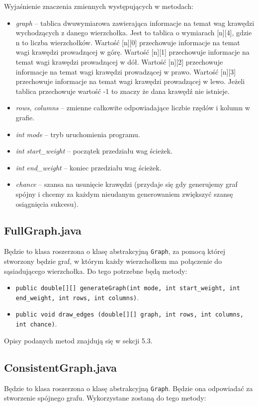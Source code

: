\documentclass[12pt, a4paper]{article}
\begin{document}
Wyjaśnienie znaczenia zmiennych występujących w metodach: 
\begin{itemize}
    \item \textit{graph} -- tablica dwuwymiarowa zawierająca informacje na temat wag krawędzi wychodzących z danego wierzchołka. Jest to tablica o wymiarach [n][4], gdzie n to liczba wierzchołków. Wartość [n][0] przechowuje informacje na temat wagi krawędzi prowadzącej w górę. Wartość [n][1] przechowuje informacje na temat wagi krawędzi prowadzącej w dół. Wartość [n][2] przechowuje informacje na temat wagi krawędzi prowadzącej w prawo. Wartość [n][3] przechowuje informacje na temat wagi krawędzi prowadzącej w lewo. Jeżeli tablica przechowuje wartość -1 to znaczy że dana krawędź nie istnieje.
    \item \textit{rows, columns} -- zmienne całkowite odpowiadające liczbie rzędów i kolumn w grafie.
    \item \textit{int mode} -- tryb uruchomienia programu.
    \item \textit{int start\_weight} -- początek przedziału wag ścieżek.
    \item \textit{int end\_weight} -- koniec przedziału wag ścieżek.
    \item \textit{chance} -- szansa na usunięcie krawędzi (przydaje się gdy generujemy graf spójny i chcemy za każdym nieudanym generowaniem zwiększyć szansę osiągnięcia sukcesu).
\end{itemize}

\subsection{FullGraph.java}
Będzie to klasa roszerzona o klasę abstrakcyjną \texttt{Graph}, za pomocą której stworzony będzie graf, w którym każdy wierzchołkem ma połączenie do sąsiadującego wierzchołka. Do tego potrzebne będą metody:
\begin{itemize}
    \item \texttt{public double[][] generateGraph(int mode, int start\_weight, int end\_weight, int rows, int columns)}.
    \item \texttt{public void draw\_edges (double[][] graph, int rows, int columns, int chance)}.
\end{itemize}
Opisy podanych metod znajdują się w sekcji 5.3.

\subsection{ConsistentGraph.java}
Będzie to klasa roszerzona o klasę abstrakcyjną \texttt{Graph}. Będzie ona odpowiadać za stworzenie spójnego grafu. Wykorzystane zostaną do tego metody:
\end{document}
